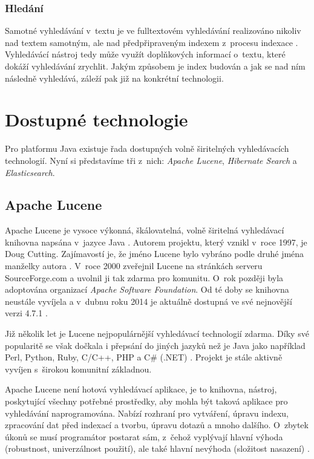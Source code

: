 \documentclass[11pt,oneside]{fithesis2}
\begin{document}
\subsection{Hledání}
Samotné vyhledávání v~textu je ve fulltextovém vyhledávání realizováno nikoliv nad textem samotným, ale nad předpřipraveným indexem z~procesu indexace \cite[s.~15]{HibernateSearchAction}. Vyhledávácí nástroj tedy může využít doplňkových informací o~textu, které dokáží vyhledávání zrychlit. Jakým způsobem je index budován a jak se nad ním následně vyhledává, záleží pak již na konkrétní technologii.

\chapter{Dostupné technologie}
Pro platformu Java existuje řada dostupných volně širitelných vyhledávacích technologií. Nyní si představíme tři z~nich: \emph{Apache Lucene}, \emph{Hibernate Search} a \emph{Elasticsearch}.

\section{Apache Lucene}
Apache Lucene je vysoce výkonná, škálovatelná, volně širitelná vyhledávací knihovna napsána v~jazyce Java \cite[s.~6]{LuceneAction}. Autorem projektu, který vznikl v~roce 1997, je Doug Cutting. Zajímavostí je, že jméno Lucene bylo vybráno podle druhé jména manželky autora \cite[s.~6]{LuceneAction}. V~roce 2000 zveřejnil Lucene na stránkách serveru SourceForge.com a uvolnil ji tak zdarma pro komunitu. O~rok později byla adoptována organizací \emph{Apache Software Foundation}. Od té doby se knihovna neustále vyvíjela a v~dubnu roku 2014 je aktuálně dostupná ve své nejnovější verzi 4.7.1 \cite[s.~6]{LuceneAction}.

Již několik let je Lucene nejpopulárnější vyhledávací technologií zdarma. Díky své popularitě se však dočkala i přepsání do jiných jazyků než je Java jako například Perl, Python, Ruby, C/C++, PHP a C\# (.NET) \cite[s.~3]{LuceneAction}. Projekt je stále aktivně vyvíjen s~širokou komunitní základnou.

Apache Lucene není hotová vyhledávací aplikace, je to knihovna, nástroj, poskytující všechny potřebné prostředky, aby mohla být taková aplikace pro vyhledávání naprogramována. Nabízí rozhraní pro vytváření, úpravu indexu, zpracování dat před indexací a tvorbu, úpravu dotazů a mnoho dalšího. O~zbytek úkonů se musí programátor postarat sám, z~čehož vyplývají hlavní výhoda (robustnost, univerzálnost použití), ale také hlavní nevýhoda (složitost nasazení) \cite[s.~7]{LuceneAction}.
\end{document}
